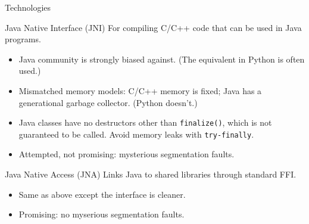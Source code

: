 \documentclass{beamer}
\begin{document}
\begin{frame}{Technologies}
\begin{block}{Java Native Interface (JNI)}
For compiling C/C++ code that can be used in Java programs.
\begin{itemize}
\item Java community is strongly biased against. (The equivalent in Python is often used.)
\item Mismatched memory models: C/C++ memory is fixed; Java has a generational garbage collector. (Python doesn't.)
\item Java classes have no destructors other than {\tt finalize()}, which is not guaranteed to be called. Avoid memory leaks with {\tt try-finally}.
\item Attempted, not promising: mysterious segmentation faults.
\end{itemize}
\end{block}

\begin{block}{Java Native Access (JNA)}
Links Java to shared libraries through standard FFI.
\begin{itemize}
\item Same as above except the interface is cleaner.
\item Promising: no myserious segmentation faults.
\end{itemize}
\end{block}
\end{frame}

\end{document}
